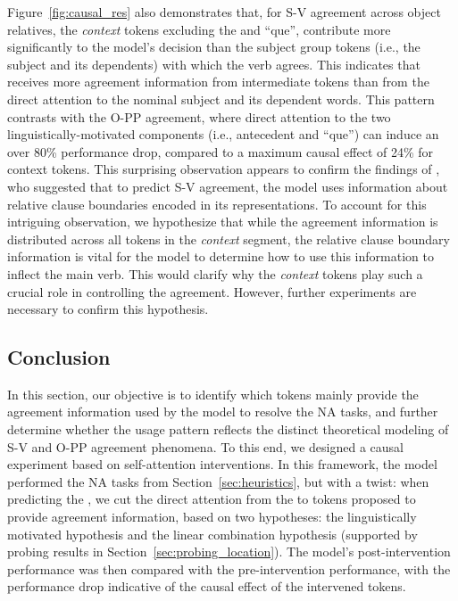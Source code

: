 Figure~\ref{fig:causal_res} also demonstrates that, for S-V agreement across object relatives, the \emph{context} tokens excluding the \cue and ``que'', contribute more significantly to the model's decision than the subject group tokens (i.e., the subject and its dependents) with which the verb agrees. This indicates that \target receives more agreement information from intermediate tokens than from the direct attention to the nominal subject and its dependent words. This pattern contrasts with the O-PP agreement, where direct attention to the two linguistically-motivated components (i.e., antecedent and ``que'') can induce an over 80\% performance drop, compared to a maximum causal effect of 24\% for context tokens. This surprising observation appears to confirm the findings of \cite{ravfogel-etal-2021-counterfactual}, who suggested that to predict S-V agreement, the model uses information about relative clause boundaries encoded in its representations. To account for this intriguing observation, we hypothesize that while the agreement information is distributed across all tokens in the \emph{context} segment, the relative clause boundary information is vital for the model to determine how to use this information to inflect the main verb. This would clarify why the \emph{context} tokens play such a crucial role in controlling the agreement. However, further experiments are necessary to confirm this hypothesis.
 
\subsection{Conclusion} \label{sec:causal_discussion}
In this section, our objective is to identify which tokens mainly provide the agreement information used by the model to resolve the NA tasks, and further determine whether the usage pattern reflects the distinct theoretical modeling of S-V and O-PP agreement phenomena. To this end, we designed a causal experiment based on self-attention interventions. In this framework, the model performed the NA tasks from Section~\ref{sec:heuristics}, but with a twist: when predicting the \target, we cut the direct attention from the \target to tokens proposed to provide agreement information, based on two hypotheses: the linguistically motivated hypothesis and the linear combination hypothesis (supported by probing results in Section~\ref{sec:probing_location}). The model's post-intervention performance was then compared with the pre-intervention performance, with the performance drop indicative of the causal effect of the intervened tokens.



